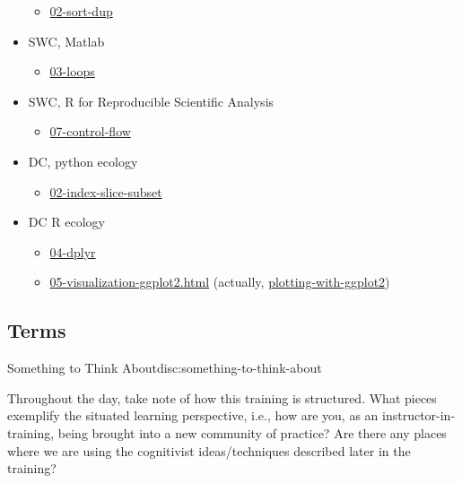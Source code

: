 \begin{itemize}
  \begin{itemize}
  \itemsep1pt\parskip0pt
  \item
    \href{\{\{\%20site.swc\_pages\%20\}\}/sql-novice-survey/02-sort-dup/}{02-sort-dup}
  \end{itemize}
\item
  SWC, Matlab

  \begin{itemize}
  \itemsep1pt\parskip0pt
  \item
    \href{\{\{\%20site.swc\_pages\%20\}\}/matlab-novice-inflammation/03-loops/}{03-loops}
  \end{itemize}
\item
  SWC, R for Reproducible Scientific Analysis

  \begin{itemize}
  \itemsep1pt\parskip0pt
  \item
    \href{\{\{\%20site.swc\_pages\%20\}\}/r-novice-gapminder/07-control-flow/}{07-control-flow}
  \end{itemize}
\item
  DC, python ecology

  \begin{itemize}
  \itemsep1pt\parskip0pt
  \item
    \href{\{\{\%20site.dc\_site\%20\}\}/python-ecology-lesson/02-index-slice-subset}{02-index-slice-subset}
  \end{itemize}
\item
  DC R ecology

  \begin{itemize}
  \itemsep1pt\parskip0pt
  \item
    \href{\{\{\%20site.dc\_site\%20\}\}/R-ecology-lesson/04-dplyr.html}{04-dplyr}
  \item
    \href{\{\{\%20site.dc\_site\%20\}\}/R-ecology-lesson/05-visualization-ggplot2.html}{05-visualization-ggplot2.html}
    (actually,
    \href{\{\{\%20site.dc\_site\%20\}\}/R-ecology-lesson/05-visualization-ggplot2.html\#plotting-with-ggplot2}{plotting-with-ggplot2})
  \end{itemize}
\end{itemize}

\subsection{Terms}\label{terms}

\begin{discussion}{Something to Think About}{disc:something-to-think-about}

Throughout the day, take note of how this training is structured. What
pieces exemplify the situated learning perspective, i.e., how are you,
as an instructor-in-training, being brought into a new community of
practice? Are there any places where we are using the cognitivist
ideas/techniques described later in the training?
\end{discussion}

